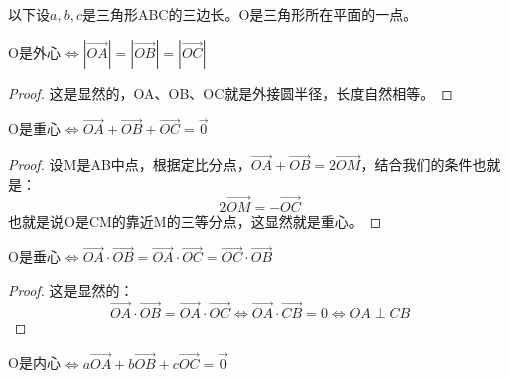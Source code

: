 以下设$a,b,c$是三角形ABC的三边长。O是三角形所在平面的一点。

\begin{theorem}
    O是外心$\iff |\overrightarrow{OA}| = |\overrightarrow{OB}| = |\overrightarrow{OC}|$
\end{theorem}

\begin{proof}
    这是显然的，OA、OB、OC就是外接圆半径，长度自然相等。
\end{proof}

\begin{theorem}
    O是重心$\iff \overrightarrow{OA} + \overrightarrow{OB} + \overrightarrow{OC} = \overrightarrow{0}$
\end{theorem}

\begin{proof}
    设M是AB中点，根据定比分点，$\overrightarrow{OA} + \overrightarrow{OB} = 2 \overrightarrow{OM}$，结合我们的条件也就是：
    $$
        2 \overrightarrow{OM} = -\overrightarrow{OC}
    $$
    也就是说O是CM的靠近M的三等分点，这显然就是重心。
\end{proof}

\begin{theorem}
    O是垂心$\iff \overrightarrow{OA} \cdot \overrightarrow{OB} = \overrightarrow{OA} \cdot \overrightarrow{OC} = \overrightarrow{OC} \cdot \overrightarrow{OB}$
\end{theorem}

\begin{proof}
    这是显然的：
    $$
        \overrightarrow{OA} \cdot \overrightarrow{OB} = \overrightarrow{OA} \cdot \overrightarrow{OC} \iff \overrightarrow{OA} \cdot \overrightarrow{CB} = 0 \iff OA \perp CB
    $$
\end{proof}

\begin{theorem}
    O是内心$\iff a\overrightarrow{OA} + b\overrightarrow{OB} + c\overrightarrow{OC} = \overrightarrow{0}$
\end{theorem}

